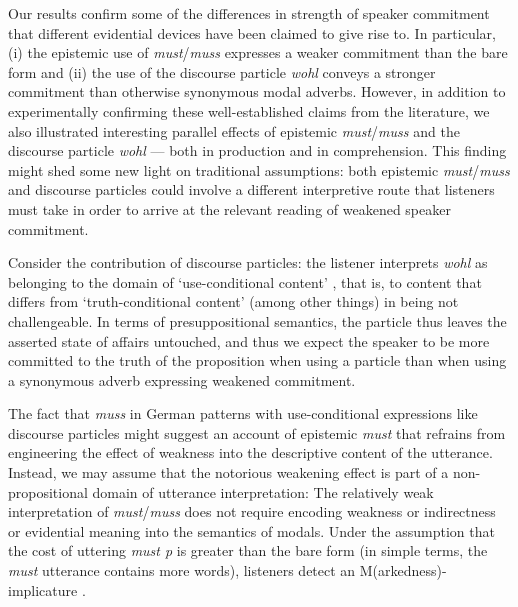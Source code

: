 \documentclass[11pt]{article}
\begin{document}
Our results confirm some of the differences in strength of speaker commitment that different evidential devices have been claimed to give rise to. In particular, (i) the epistemic use of \emph{must}/\emph{muss} expresses a weaker commitment than the bare form and (ii) the use of the discourse particle \emph{wohl} conveys a stronger commitment than otherwise synonymous modal adverbs. However, in addition to experimentally confirming these well-established claims from the literature, we also illustrated interesting parallel effects of epistemic \emph{must}/\emph{muss} and the discourse particle \emph{wohl} — both in production and in comprehension. This finding might shed some new light on traditional assumptions: both epistemic  \emph{must}/\emph{muss} and discourse particles could involve a different interpretive route that listeners must take in order to arrive at the relevant reading of weakened speaker commitment. %

Consider the contribution of discourse particles: the listener interprets \emph{wohl} as belonging to the domain of ‘use-conditional content’ \citep{Recanati2004}, that is, to content that differs from ‘truth-conditional content’ (among other things) in being not challengeable. In terms of presuppositional semantics, the particle thus leaves the asserted state of affairs untouched, and thus we expect the speaker to be more committed to the truth of the proposition when using a particle than when using a synonymous adverb expressing weakened commitment. %

The fact that \emph{muss} in German patterns with use-conditional expressions like discourse particles might suggest an account of epistemic \emph{must} that refrains from engineering the effect of weakness into the descriptive content of the utterance. Instead, we may assume that the notorious weakening effect is part of a non-propositional domain of utterance interpretation: The relatively weak interpretation of \emph{must}/\emph{muss} does not require encoding weakness or indirectness or evidential meaning into the semantics of modals. Under the assumption that the cost of uttering \emph{must p} is greater than the bare form (in simple terms, the \emph{must} utterance contains more words), listeners detect an M(arkedness)-implicature \citep{levinson2000}. 
\end{document}

